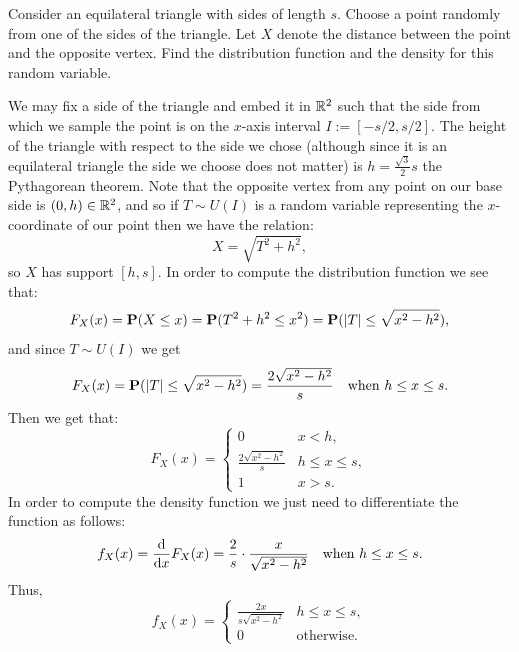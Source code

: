 \documentclass[11pt,a4paper]{article}
\begin{document}
\begin{exercise}
  Consider an equilateral triangle with sides of length $s$.
  Choose a point randomly from one of the sides of the triangle.
  Let $X$ denote the distance between the point and the opposite vertex.
  Find the distribution function and the density for this random variable.
\end{exercise}
\begin{solution}
  We may fix a side of the triangle and embed it in $\mathbb{R}^2$ such that
  the side from which we sample the point is on the $x$-axis
  interval $I := [-s/2,s/2]$.
  The height of the triangle with respect to the side we chose (although
  since it is an equilateral triangle the side we choose does not matter)
  is $h = \frac{\sqrt 3}{2} s$ the Pythagorean theorem.
  Note that the opposite vertex from any point on our base side
  is $(0,h) \in \mathbb{R}^2$, and so if $T \sim U(I)$ is a random variable representing
  the $x$-coordinate of our point then we have the relation:
  \[
    X = \sqrt{T^2 + h^2},
  \]
  so $X$ has support $[h,s]$.
  In order to compute the distribution function we see that:
  \[
    F_X(x) =
    \mathbf{P}(X \le x) =
    \mathbf{P}(T^2 + h^2 \le x^2) =
    \mathbf{P}(|T| \le \sqrt{x^2 - h^2}),
  \]
  and since $T \sim U(I)$ we get
  \[
    F_X(x) =
    \mathbf{P}(|T| \le \sqrt{x^2 - h^2}) =
    \frac{2 \sqrt{x^2 - h^2}}{s} \quad \text{when } h \le x \le s.
  \]
  Then we get that:
  \[
    F_X(x) =
    \begin{cases}
      0 &x < h, \\
      \frac{2 \sqrt{x^2 - h^2}}{s} &h \le x \le s, \\
      1 &x > s.
    \end{cases}
  \]
  In order to compute the density function we just need to differentiate
  the function as follows:
  \[
    f_X(x) =
    \frac{\dif}{\dx} F_X(x) =
    \frac{2}{s} \cdot \frac{x}{\sqrt{x^2 - h^2}} \quad
      \text{when } h \le x \le s.
  \]
  Thus,
  \[
    f_X(x) =
    \begin{cases}
      \frac{2x}{s \sqrt{x^2 - h^2}} &h \le x \le s, \\
      0 &\text{otherwise}.
    \end{cases}
  \]
\end{solution}
\end{document}

